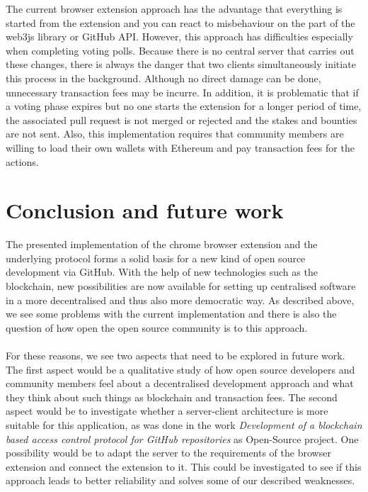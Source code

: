 \documentclass[sigconf]{acmart}
\begin{document}
The current browser extension approach has the advantage that everything is started from the extension and you can react to misbehaviour 
on the part of the web3js library or GitHub API. However, this approach has difficulties especially when completing voting polls.
Because there is no central server that carries out these changes, there is always the danger that two clients simultaneously initiate 
this process in the background. Although no direct damage can be done, unnecessary transaction fees may be incurre. In addition, it is 
problematic that if a voting phase expires but no one starts the extension for a longer period of time, the associated pull request is not 
merged or rejected and the stakes and bounties are not sent. Also, this implementation requires that community members are willing to 
load their own wallets with Ethereum and pay transaction fees for the actions.

\section{Conclusion and future work}
The presented implementation of the chrome browser extension and the underlying protocol forms a solid basis for a new kind of 
open source development via GitHub. With the help of new technologies such as the blockchain, new possibilities are now available 
for setting up centralised software in a more decentralised and thus also more democratic way. As described above, we see some 
problems with the current implementation and there is also the question of how open the open source community is to this approach. \\ \\
For these reasons, we see two aspects that need to be explored in future work. The first aspect would be a qualitative study of how 
open source developers and community members feel about a decentralised development approach and what they think about such
 things as blockchain and transaction fees. The second aspect would be to investigate whether a server-client architecture is more 
suitable for this application, as was done in the work \textit{Development of a blockchain based access control protocol for 
GitHub repositories} \cite{ulrich2020dev} as Open-Source project. One possibility would be to adapt the server to the requirements
of the browser extension and connect the extension to it. This could be investigated to see if this approach leads to better reliability 
and solves some of our described weaknesses.




\appendix
\end{document}
